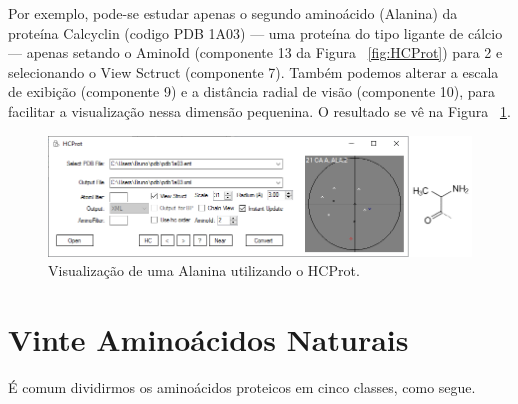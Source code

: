 Por exemplo, pode-se estudar apenas o segundo aminoácido (Alanina) da proteína Calcyclin (codigo PDB 1A03) --- uma proteína do tipo ligante de cálcio --- apenas setando o AminoId (componente 13 da Figura ~\ref{fig:HCProt}) para 2 e selecionando o View Sctruct (componente 7). Também podemos alterar a escala de exibição (componente 9) e a distância radial de visão (componente 10), para facilitar a visualização nessa dimensão pequenina. O resultado se vê na Figura ~\ref{fig:exemploView}.

\begin{figure}[H]
	\hspace{-1.3cm}
	\includegraphics[width=1.2\linewidth]{secProteins/figures/exemploView.png}
	\caption{Visualização de uma Alanina utilizando o HCProt.}
	\label{fig:exemploView}
\end{figure}

\chapter{Vinte Aminoácidos Naturais} 

É comum dividirmos os aminoácidos proteicos em cinco classes, como segue.
